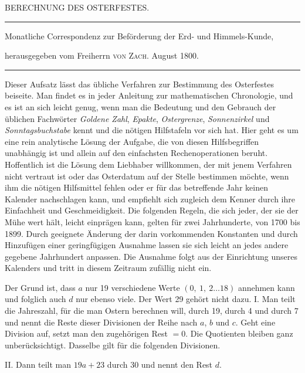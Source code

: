 \clearpage
{}
%
\begin{center}
{\large BERECHNUNG DES OSTERFESTES.\par}
\medskip\hrule\medskip
{\small Monatliche Correspondenz zur Beförderung der Erd- und Himmels-Kunde,\par
herausgegeben vom Freiherrn \textsc{von Zach}. August 1800.\par}
\medskip\hrule
\end{center}
\medskip
Dieser Aufsatz lässt das übliche Verfahren zur Bestimmung des Osterfestes beiseite. Man findet es in jeder Anleitung zur mathematischen Chronologie, und es ist an sich leicht genug, wenn man die Bedeutung und den Gebrauch der üblichen Fachwörter \textit{Goldene Zahl}, \textit{Epakte}, \textit{Ostergrenze}, \textit{Sonnenzirkel} und \textit{Sonntagsbuchstabe} kennt und die nötigen Hilfstafeln vor sich hat. Hier geht es um eine rein analytische Lösung der Aufgabe, die von diesen Hilfsbegriffen unabhängig ist und allein auf den einfachsten Rechenoperationen beruht. Hoffentlich ist die Lösung dem Liebhaber willkommen, der mit jenem Verfahren nicht vertraut ist oder das Osterdatum auf der Stelle bestimmen möchte, wenn ihm die nötigen Hilfsmittel fehlen oder er für das betreffende Jahr keinen Kalender nachschlagen kann, und empfiehlt sich zugleich dem Kenner durch ihre Einfachheit und Geschmeidigkeit. Die folgenden Regeln, die sich jeder, der sie der Mühe wert hält, leicht einprägen kann, gelten für zwei Jahrhunderte, von 1700 bis 1899. Durch geeignete Änderung der darin vorkommenden Konstanten und durch Hinzufügen einer geringfügigen Ausnahme lassen sie sich leicht an jedes andere gegebene Jahrhundert anpassen. Die Ausnahme folgt aus der Einrichtung unseres Kalenders und tritt in diesem Zeitraum zufällig nicht ein.

%
\expandafter\def\csname HistoricalNoteText2\endcsname{Der Grund ist, dass $a$ nur 19 verschiedene Werte $(0,\ 1,\ 2\ldots18)$ annehmen kann und folglich auch $d$ nur ebenso viele. Der Wert 29 gehört nicht dazu.}
I. Man teilt die Jahreszahl, für die man Ostern berechnen will, durch 19, durch 4 und durch 7 und nennt die Reste dieser Divisionen der Reihe nach $a$, $b$ und $c$. Geht eine Division auf, setzt man den zugehörigen Rest $=0$. Die Quotienten bleiben ganz unberücksichtigt. Dasselbe gilt für die folgenden Divisionen.

II. Dann teilt man $19a+23$ durch 30 und nennt den Rest $d$.

